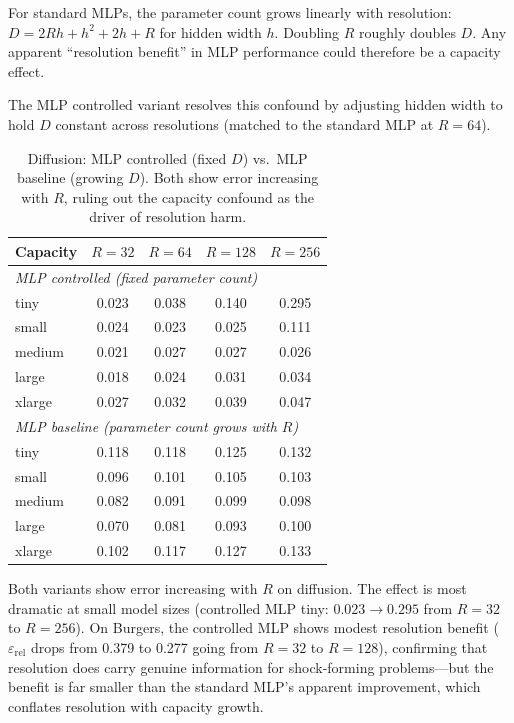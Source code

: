 \documentclass[11pt]{article}
\newcommand{\relLtwo}{\varepsilon_{\mathrm{rel}}}
\begin{document}
For standard MLPs, the parameter count grows linearly with
resolution: $D = 2Rh + h^2 + 2h + R$ for hidden width $h$.
Doubling $R$ roughly doubles $D$. Any apparent ``resolution
benefit'' in MLP performance could therefore be a capacity effect.

The MLP controlled variant resolves this confound by adjusting
hidden width to hold $D$ constant across resolutions (matched to
the standard MLP at $R = 64$).

\begin{table}[h]
\centering
\caption{Diffusion: MLP controlled (fixed $D$) vs.\ MLP baseline
(growing $D$). Both show error increasing with $R$, ruling out the
capacity confound as the driver of resolution harm.}
\label{tab:mlp-controlled}
\small
\begin{tabular}{@{}lcccc@{}}
\toprule
\textbf{Capacity} & $R{=}32$ & $R{=}64$ & $R{=}128$ & $R{=}256$ \\
\midrule
\multicolumn{5}{l}{\emph{MLP controlled (fixed parameter count)}} \\
tiny      & 0.023 & 0.038 & 0.140 & 0.295 \\
small     & 0.024 & 0.023 & 0.025 & 0.111 \\
medium    & 0.021 & 0.027 & 0.027 & 0.026 \\
large     & 0.018 & 0.024 & 0.031 & 0.034 \\
xlarge    & 0.027 & 0.032 & 0.039 & 0.047 \\
\midrule
\multicolumn{5}{l}{\emph{MLP baseline (parameter count grows with $R$)}} \\
tiny      & 0.118 & 0.118 & 0.125 & 0.132 \\
small     & 0.096 & 0.101 & 0.105 & 0.103 \\
medium    & 0.082 & 0.091 & 0.099 & 0.098 \\
large     & 0.070 & 0.081 & 0.093 & 0.100 \\
xlarge    & 0.102 & 0.117 & 0.127 & 0.133 \\
\bottomrule
\end{tabular}
\end{table}

Both variants show error increasing with $R$ on diffusion.
The effect is most dramatic at small model sizes (controlled MLP
tiny: $0.023 \to 0.295$ from $R = 32$ to $R = 256$).
On Burgers, the controlled MLP shows modest resolution benefit
($\relLtwo$ drops from 0.379 to 0.277 going from $R = 32$ to
$R = 128$), confirming that resolution does carry genuine
information for shock-forming problems---but the benefit is far
smaller than the standard MLP's apparent improvement, which
conflates resolution with capacity growth.
\end{document}
